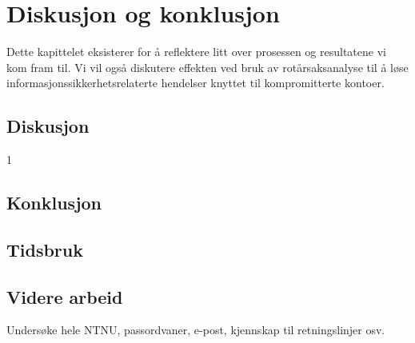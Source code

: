 \chapter{Diskusjon og konklusjon}
Dette kapittelet eksisterer for å reflektere litt over prosessen og resultatene vi kom fram til. Vi vil også diskutere effekten ved bruk av rotårsaksanalyse til å løse informasjonssikkerhetsrelaterte hendelser knyttet til kompromitterte kontoer.

\section{Diskusjon}

1
\section{Konklusjon}


\section{Tidsbruk}


\section{Videre arbeid}
Undersøke hele NTNU, passordvaner, e-post, kjennskap til retningslinjer osv. 